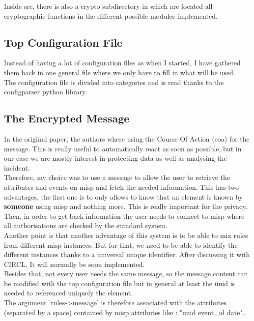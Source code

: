 \documentclass{eplmastersthesis}
\begin{document}
Inside src, there is also a crypto subdirectory in which are located all cryptographic functions in the different possible modules implemented.

\subsection{Top Configuration File}
Instead of having a lot of configuration files as when I started, I have gathered them back in one general file where we only have to fill in what will be used.\\
The configuration file is divided into categories and is read thanks to the configparser python library.

\subsection{The Encrypted Message}
In the original paper, the authors where using the Course Of Action (\gls{coa}) for the message. This is really useful to automatically react as soon as possible, but in our case we are mostly interest in protecting data as well as analysing the incident.\\
Therefore, my choice was to use a message to allow the user to retrieve the attributes and events on \gls{misp} and fetch the needed information. This has two advantages, the first one is to only allows to know that an element is known by \textbf{someone} using \gls{misp} and nothing more. This is really important for the privacy. Then, in order to get back information the user needs to connect to \gls{misp} where all authorisations are checked by the standard system.\\

Another point is that another advantage of this system is to be able to mix rules from different \gls{misp} instances. But for that, we need to be able to identify the different instances thanks to a universal unique identifier. After discussing it with CIRCL, It will normally be soon implemented.\\

Besides that, not every user needs the same message, so the message content can be modified with the top configuration file but in general at least the \gls{uuid} is needed to referenced uniquely the element.\\
The argument 'rules->message' is therefore associated with the attributes (separated by a space) contained by \gls{misp} attributes like : "uuid event\_id date".
\end{document}
